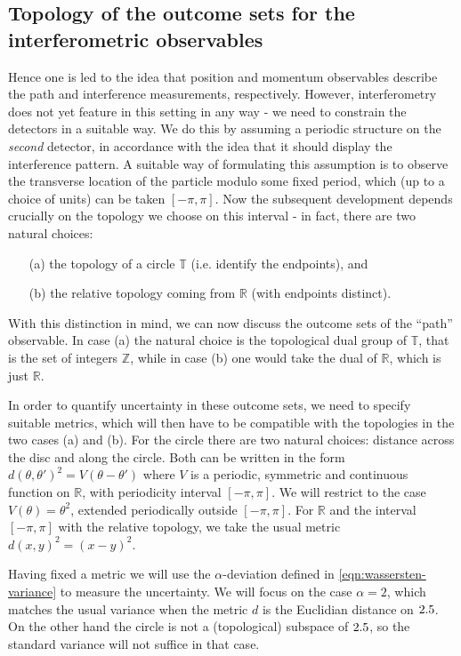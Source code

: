 \subsection{Topology of the outcome sets for the interferometric observables}

Hence one is led to the idea that position and momentum observables describe the path and interference measurements, respectively. However, interferometry does not yet feature in this setting in any way - we need to constrain the detectors in a suitable way. We do this by assuming a periodic structure on the \emph{second} detector, in accordance with the idea that it should display the interference pattern. A suitable way of formulating this assumption is to observe the transverse location of the particle modulo some fixed period, which (up to a choice of units) can be taken $[-\pi,\pi]$. Now the subsequent development depends crucially on the topology we choose on this interval - in fact, there are two natural choices:
\begin{itemize}
\item[(a)] the topology of a circle $\mathbb T$ (i.e. identify the endpoints), and
\item[(b)] the relative topology coming from $\mathbb R$ (with endpoints distinct).
\end{itemize}
With this distinction in mind, we can now discuss the outcome sets of the ``path'' observable. In case (a) the natural choice is the topological dual group of $\mathbb T$, that is the set of integers $\mathbb Z$, while in case (b) one would take the dual of $\mathbb R$, which is just $\mathbb R$.

In order to quantify uncertainty in these outcome sets, we need to specify suitable metrics, which will then have to be compatible with the topologies in the two cases (a) and (b). For the circle there are two natural choices: distance across the disc and along the circle. Both can be written in the form $d(\theta,\theta')^2 = V(\theta-\theta')$ where $V$ is a periodic, symmetric and continuous function on $\mathbb R$, with periodicity interval $[-\pi,\pi]$. We will restrict to the case $V(\theta) = \theta^2$, extended periodically outside $[-\pi,\pi]$. For $\mathbb R$ and the interval $[-\pi,\pi]$ with the relative topology, we take the usual metric $d(x,y)^2=(x-y)^2$.

Having fixed a metric we will use the $\alpha$-deviation defined in \eqref{eqn:wassersten-variance} to measure the uncertainty. We will focus on the case $\alpha=2$, which matches the usual variance when the metric $d$ is the Euclidian distance on $2.5$. On the other hand the circle is not a (topological) subspace of $2.5$, so the standard variance will not suffice in that case.

